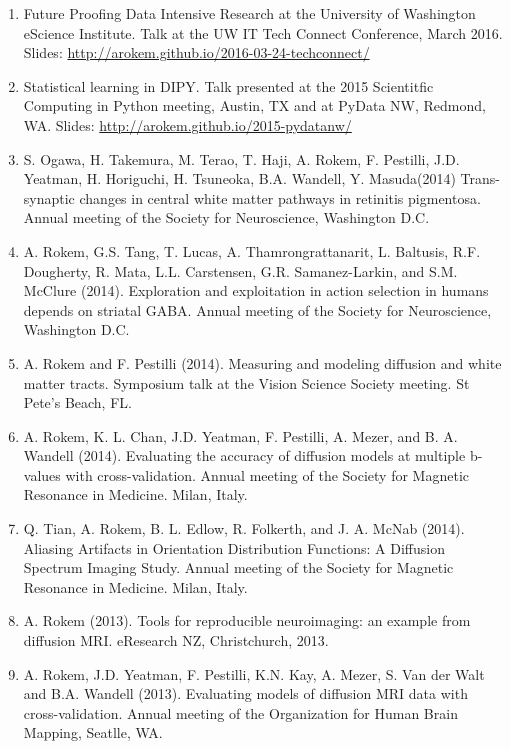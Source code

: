 \documentclass[11pt,fullpage]{article}
\begin{document}
\begin{enumerate}

\item Future Proofing Data Intensive Research at the University of Washington eScience Institute. Talk at the UW IT Tech Connect Conference, March 2016. Slides: \url{http://arokem.github.io/2016-03-24-techconnect/}

\item Statistical learning in DIPY. Talk presented at the 2015 Scientitfic Computing in Python meeting, Austin, TX and at PyData NW, Redmond, WA. Slides: \url{http://arokem.github.io/2015-pydatanw/}

\item S. Ogawa, H. Takemura, M. Terao, T. Haji, A. Rokem, F. Pestilli, J.D. Yeatman, H. Horiguchi, H. Tsuneoka, B.A. Wandell, Y. Masuda(2014) Trans-synaptic changes in central white matter pathways in retinitis pigmentosa. Annual meeting of the Society for Neuroscience, Washington D.C.

\item A. Rokem, G.S. Tang, T. Lucas, A. Thamrongrattanarit, L. Baltusis, R.F. Dougherty, R. Mata, L.L. Carstensen, G.R. Samanez-Larkin, and S.M. McClure (2014). Exploration and exploitation in action selection in humans depends on striatal GABA. Annual meeting of the Society for Neuroscience, Washington D.C.

\item A. Rokem and F. Pestilli (2014). Measuring and modeling diffusion and white matter tracts. Symposium talk at the Vision Science Society meeting. St Pete's Beach, FL.

\item A. Rokem, K. L. Chan, J.D. Yeatman, F. Pestilli, A. Mezer, and B. A. Wandell (2014). Evaluating the accuracy of diffusion models at multiple b-values with cross-validation. Annual meeting of the Society for Magnetic Resonance in Medicine. Milan, Italy.

\item Q. Tian, A. Rokem, B. L. Edlow, R. Folkerth, and J. A. McNab (2014). Aliasing Artifacts in Orientation Distribution Functions: A Diffusion Spectrum Imaging Study. Annual meeting of the Society for Magnetic Resonance in Medicine. Milan, Italy.

\item A. Rokem (2013). Tools for reproducible neuroimaging: an example from diffusion MRI. eResearch NZ, Christchurch, 2013.

\item A. Rokem, J.D. Yeatman, F. Pestilli, K.N. Kay, A. Mezer, S. Van der Walt and B.A. Wandell (2013). Evaluating models of diffusion MRI data with cross-validation. Annual meeting of the Organization for Human Brain Mapping, Seatlle, WA.


\end{enumerate}
\end{document}
